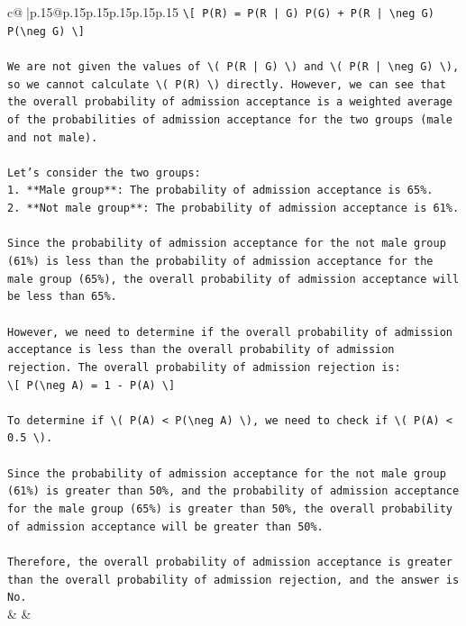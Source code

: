 \documentclass{article}
\begin{document}
{\begin{supertabular}{c@{$\;$}|p{.15\linewidth}@{}p{.15\linewidth}p{.15\linewidth}p{.15\linewidth}p{.15\linewidth}p{.15\linewidth}}
{{{\texttt{\textbackslash{}{[} P(R) = P(R | G) P(G) + P(R | \textbackslash{}neg G) P(\textbackslash{}neg G) \textbackslash{}{]}} \\
\\ 
\texttt{We are not given the values of \textbackslash{}( P(R | G) \textbackslash{}) and \textbackslash{}( P(R | \textbackslash{}neg G) \textbackslash{}), so we cannot calculate \textbackslash{}( P(R) \textbackslash{}) directly. However, we can see that the overall probability of admission acceptance is a weighted average of the probabilities of admission acceptance for the two groups (male and not male).} \\
\\ 
\texttt{Let's consider the two groups:} \\
\texttt{1. **Male group**: The probability of admission acceptance is 65\%.} \\
\texttt{2. **Not male group**: The probability of admission acceptance is 61\%.} \\
\\ 
\texttt{Since the probability of admission acceptance for the not male group (61\%) is less than the probability of admission acceptance for the male group (65\%), the overall probability of admission acceptance will be less than 65\%.} \\
\\ 
\texttt{However, we need to determine if the overall probability of admission acceptance is less than the overall probability of admission rejection. The overall probability of admission rejection is:} \\
\texttt{\textbackslash{}{[} P(\textbackslash{}neg A) = 1 {-} P(A) \textbackslash{}{]}} \\
\\ 
\texttt{To determine if \textbackslash{}( P(A) < P(\textbackslash{}neg A) \textbackslash{}), we need to check if \textbackslash{}( P(A) < 0.5 \textbackslash{}).} \\
\\ 
\texttt{Since the probability of admission acceptance for the not male group (61\%) is greater than 50\%, and the probability of admission acceptance for the male group (65\%) is greater than 50\%, the overall probability of admission acceptance will be greater than 50\%.} \\
\\ 
\texttt{Therefore, the overall probability of admission acceptance is greater than the overall probability of admission rejection, and the answer is No.} \\
            }
        }
    }
    & & \\ \\


\end{supertabular}}
\end{document}
